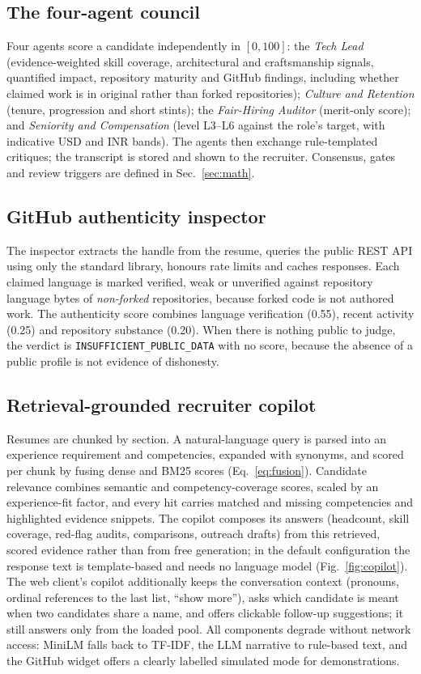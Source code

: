 \documentclass[conference]{IEEEtran}
\newcommand{\flag}[1]{\texttt{\footnotesize #1}}
\begin{document}
\subsection{The four-agent council}
Four agents score a candidate independently in $[0,100]$: the \emph{Tech Lead} (evidence-weighted skill coverage, architectural and craftsmanship signals, quantified impact, repository maturity and GitHub findings, including whether claimed work is in original rather than forked repositories); \emph{Culture and Retention} (tenure, progression and short stints); the \emph{Fair-Hiring Auditor} (merit-only score); and \emph{Seniority and Compensation} (level L3--L6 against the role's target, with indicative USD and INR bands). The agents then exchange rule-templated critiques; the transcript is stored and shown to the recruiter. Consensus, gates and review triggers are defined in Sec.~\ref{sec:math}.

\subsection{GitHub authenticity inspector}
The inspector extracts the handle from the resume, queries the public REST API using only the standard library, honours rate limits and caches responses. Each claimed language is marked verified, weak or unverified against repository language bytes of \emph{non-forked} repositories, because forked code is not authored work. The authenticity score combines language verification (0.55), recent activity (0.25) and repository substance (0.20). When there is nothing public to judge, the verdict is \flag{INSUFFICIENT\_PUBLIC\_DATA} with no score, because the absence of a public profile is not evidence of dishonesty.

\subsection{Retrieval-grounded recruiter copilot}
Resumes are chunked by section. A natural-language query is parsed into an experience requirement and competencies, expanded with synonyms, and scored per chunk by fusing dense and BM25 scores (Eq.~\ref{eq:fusion}). Candidate relevance combines semantic and competency-coverage scores, scaled by an experience-fit factor, and every hit carries matched and missing competencies and highlighted evidence snippets. The copilot composes its answers (headcount, skill coverage, red-flag audits, comparisons, outreach drafts) from this retrieved, scored evidence rather than from free generation; in the default configuration the response text is template-based and needs no language model (Fig.~\ref{fig:copilot}). The web client's copilot additionally keeps the conversation context (pronouns, ordinal references to the last list, ``show more''), asks which candidate is meant when two candidates share a name, and offers clickable follow-up suggestions; it still answers only from the loaded pool. All components degrade without network access: MiniLM falls back to TF-IDF, the LLM narrative to rule-based text, and the GitHub widget offers a clearly labelled simulated mode for demonstrations.
\end{document}
